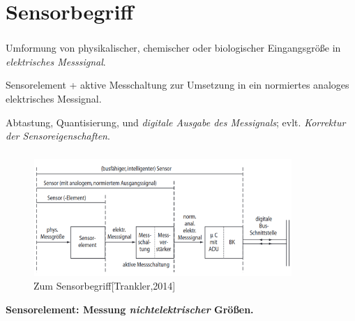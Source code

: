 \section{Sensorbegriff}
\begin{frame}
    \frametitle{\insertsection}
    \vfill
    \begin{definition}[Sensorelement]
        \raggedright
        Umformung von physikalischer, chemischer oder biologischer Eingangsgröße in \emph{elektrisches Messsignal}.
    \end{definition}
    \vfill
    \begin{definition}
        \raggedright
        Sensorelement + aktive Messchaltung zur Umsetzung in ein normiertes analoges elektrisches Messignal.
    \end{definition}
    \vfill
    \begin{definition}
        \raggedright
        Abtastung, Quantisierung, und \emph{digitale Ausgabe des Messignals}; evlt. \emph{Korrektur der Sensoreigenschaften}.
    \end{definition}
    \vfill
\end{frame}

\begin{frame}
    \frametitle{\insertsection}
    \vfill
    \begin{figure}
        \centerline{\includegraphics[height=12em]{Abbildung01_zum_sensorbegriff.png}}
        \caption{Zum Sensorbegriff[Trankler,2014]}
        \end{figure}
    \centering
    \textbf{Sensorelement: Messung \emph{nichtelektrischer} Größen.}
\end{frame}

